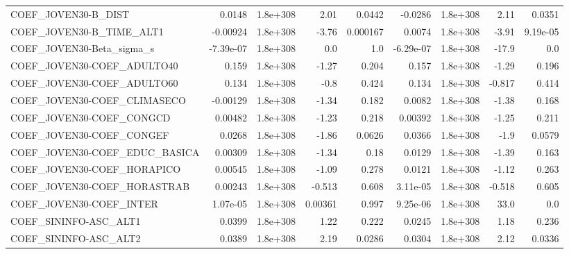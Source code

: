 \begin{tabular}{lrrrrrrrr}
COEF\_JOVEN30-B\_DIST               &      0.0148 &     1.8e+308 &      2.01 &   0.0442 &    -0.0286 &    1.8e+308 &         2.11 &        0.0351 \\
COEF\_JOVEN30-B\_TIME\_ALT1          &    -0.00924 &     1.8e+308 &     -3.76 & 0.000167 &     0.0074 &    1.8e+308 &        -3.91 &      9.19e-05 \\
COEF\_JOVEN30-Beta\_sigma\_s         &   -7.39e-07 &     1.8e+308 &       0.0 &      1.0 &  -6.29e-07 &    1.8e+308 &        -17.9 &           0.0 \\
COEF\_JOVEN30-COEF\_ADULTO40        &       0.159 &     1.8e+308 &     -1.27 &    0.204 &      0.157 &    1.8e+308 &        -1.29 &         0.196 \\
COEF\_JOVEN30-COEF\_ADULTO60        &       0.134 &     1.8e+308 &      -0.8 &    0.424 &      0.134 &    1.8e+308 &       -0.817 &         0.414 \\
COEF\_JOVEN30-COEF\_CLIMASECO       &    -0.00129 &     1.8e+308 &     -1.34 &    0.182 &     0.0082 &    1.8e+308 &        -1.38 &         0.168 \\
COEF\_JOVEN30-COEF\_CONGCD          &     0.00482 &     1.8e+308 &     -1.23 &    0.218 &    0.00392 &    1.8e+308 &        -1.25 &         0.211 \\
COEF\_JOVEN30-COEF\_CONGEF          &      0.0268 &     1.8e+308 &     -1.86 &   0.0626 &     0.0366 &    1.8e+308 &         -1.9 &        0.0579 \\
COEF\_JOVEN30-COEF\_EDUC\_BASICA     &     0.00309 &     1.8e+308 &     -1.34 &     0.18 &     0.0129 &    1.8e+308 &        -1.39 &         0.163 \\
COEF\_JOVEN30-COEF\_HORAPICO        &     0.00545 &     1.8e+308 &     -1.09 &    0.278 &     0.0121 &    1.8e+308 &        -1.12 &         0.263 \\
COEF\_JOVEN30-COEF\_HORASTRAB       &     0.00243 &     1.8e+308 &    -0.513 &    0.608 &   3.11e-05 &    1.8e+308 &       -0.518 &         0.605 \\
COEF\_JOVEN30-COEF\_INTER           &    1.07e-05 &     1.8e+308 &   0.00361 &    0.997 &   9.25e-06 &    1.8e+308 &         33.0 &           0.0 \\
COEF\_SININFO-ASC\_ALT1             &      0.0399 &     1.8e+308 &      1.22 &    0.222 &     0.0245 &    1.8e+308 &         1.18 &         0.236 \\
COEF\_SININFO-ASC\_ALT2             &      0.0389 &     1.8e+308 &      2.19 &   0.0286 &     0.0304 &    1.8e+308 &         2.12 &        0.0336 \\

\end{tabular}
